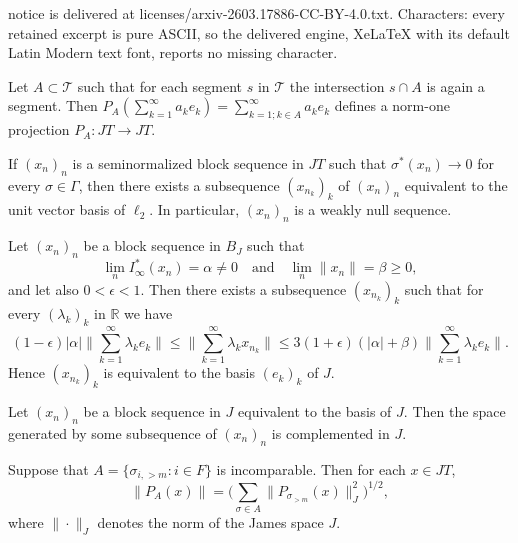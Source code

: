 \documentclass[10pt,a4paper]{amsart}
\newcommand{\R}{\mathbb{R}}
\newcommand{\Tree}{\mathcal{T}}
\newcommand{\s}{\sigma}
\begin{document}
notice is delivered at licenses/arxiv-2603.17886-CC-BY-4.0.txt. Characters: every retained excerpt is pure ASCII, so the delivered engine, XeLaTeX with its default Latin Modern text font, reports no missing character.
\begin{proposition}\label{P_A}
Let $A\subset \Tree$ such that for each segment $s$ in $\Tree$ the intersection $s\cap A$ is again a segment. Then $P_A(\sum_{k=1}^\infty a_k e_{k}) = \sum_{k=1; k\in A}^\infty a_k e_{k}$ defines a norm-one projection $P_A:JT\to JT$.
\end{proposition}

\begin{theorem}\label{A-I}
If $(x_n)_n$ is a seminormalized block sequence in $JT$ such that $\sigma^*(x_n) \to 0$ for every $\sigma \in \Gamma$, then there exists a subsequence $(x_{n_k})_k$ of $(x_n)_n$ equivalent to the unit vector basis of $\ell_2$. In particular, $(x_n)_n$ is a weakly null sequence.
\end{theorem}

\begin{proposition}\label{P10}
Let $(x_n)_n$ be a block sequence in $B_J$ such that
\[ \lim_n I_\infty^*(x_n) = \alpha \neq 0 \quad \text{and} \quad \lim_n \|x_n\| =\beta \geq 0,\]
and let also $0< \epsilon < 1$. Then there exists a subsequence $(x_{n_k})_k$ such that for every $(\lambda_k)_k$ in $\R$ we have
\begin{equation}\label{eqn:eq.6}
(1-\epsilon) |\alpha|\Big\| \sum_{k=1}^\infty \lambda_k e_k \Big\| \leq \Big\| \sum_{k=1}^\infty \lambda_k x_{n_k} \Big\| \leq 3(1+\epsilon)(|\alpha|+ \beta)\Big\| \sum_{k=1}^\infty \lambda_k e_k \Big\|.
\end{equation}
Hence $(x_{n_k})_k$ is equivalent to the basis $(e_k)_k$ of $J$.
\end{proposition}

\begin{lemma}\label{compl.J} Let $(x_n)_n$ be a block sequence in $J$ equivalent to the basis of $J$. Then the space generated by some subsequence of $(x_n)_n$ is complemented in $J$.
\end{lemma}

\begin{lemma}\label{L8}
Suppose that $A = \{ \s_{i,>m} : i\in F\}$ is incomparable. Then for each $x\in JT$,
\[ \|P_A(x)\| = \Big( \sum_{\s \in A} \|P_{\s_{> m}}(x)\|_J^2 \Big)^{1/2}, \]
where $\|\cdot\|_J$ denotes the norm of the James space $J$.
\end{lemma}
\end{document}
